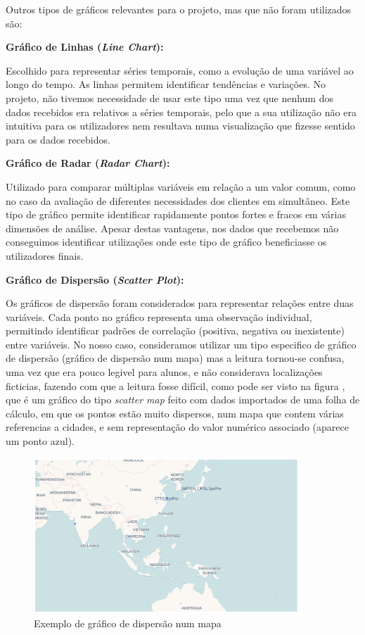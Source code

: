 Outros tipos de gráficos relevantes para o projeto, mas que não foram utilizados são:

\textbf{Gráfico de Linhas (\textit{Line Chart}):}  

Escolhido para representar séries temporais, como a evolução de uma variável ao longo do tempo. As linhas permitem identificar tendências e variações. No projeto, não tivemos necessidade de usar este tipo uma vez que nenhum dos dados recebidos era relativos a séries temporais, pelo que a sua utilização não era intuitiva para os utilizadores nem resultava numa visualização que fizesse sentido para os dados recebidos.

\textbf{Gráfico de Radar (\textit{Radar Chart}):}  

Utilizado para comparar múltiplas variáveis em relação a um valor comum, como no caso da avaliação de diferentes necessidades dos clientes em simultâneo. Este tipo de gráfico permite identificar rapidamente pontos fortes e fracos em várias dimensões de análise. Apesar destas vantagens, nos dados que recebemos não conseguimos identificar utilizações onde este tipo de gráfico beneficiasse os utilizadores finais.

\textbf{Gráfico de Dispersão (\textit{Scatter Plot}):}

Os gráficos de dispersão foram considerados para representar relações entre duas variáveis. Cada ponto no gráfico representa uma observação individual, permitindo identificar padrões de correlação (positiva, negativa ou inexistente) entre variáveis. No nosso caso, consideramos utilizar um tipo especifico de gráfico de dispersão (gráfico de dispersão num mapa) mas a leitura tornou-se confusa, uma vez que era pouco legivel para alunos, e não considerava localizações ficticias, fazendo com que a leitura fosse difícil, como pode ser visto na figura  \label{fig:scatter-map}, que é um gráfico do tipo \textit{scatter map} feito com dados importados de uma folha de cálculo, em que os pontos estão muito dispersos, num mapa que contem várias referencias a cidades, e sem representação do valor numérico associado (aparece um ponto azul).

\begin{figure}[H]
    \centering
    \includegraphics[max width=10cm]{./img/scatter_map}
    \caption{Exemplo de gráfico de dispersão num mapa}
    \label{fig:scatter-map}
\end{figure}
\noindent

